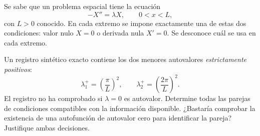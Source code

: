 Se sabe que un problema espacial tiene la ecuación
\[
-X''=\lambda X,\qquad 0<x<L,
\]
con \(L>0\) conocido. En cada extremo se impone exactamente una de estas dos condiciones: valor nulo \(X=0\) o derivada nula \(X'=0\). Se desconoce cuál se usa en cada extremo.

Un registro sintético exacto contiene los dos menores autovalores \emph{estrictamente positivos}:
\[
\lambda_1^+=\left(\frac{\pi}{L}\right)^2,
\qquad \lambda_2^+=\left(\frac{2\pi}{L}\right)^2.
\]
El registro no ha comprobado si \(\lambda=0\) es autovalor. Determine todas las parejas de condiciones compatibles con la información disponible. ¿Bastaría comprobar la existencia de una autofunción de autovalor cero para identificar la pareja? Justifique ambas decisiones.
